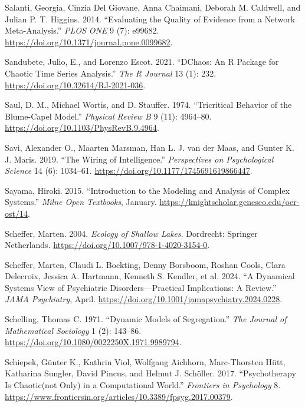\documentclass[
  a4paper,
  DIV=11,
  numbers=noendperiod,
  oneside]{scrreprt}
\newlength{\cslhangindent}
\newenvironment{CSLReferences}[2] %
 {\begin{list}{}{%
  \setlength{\itemindent}{0pt}
  \setlength{\leftmargin}{0pt}
  \setlength{\parsep}{0pt}
  \ifodd #1
   \setlength{\leftmargin}{\cslhangindent}
   \setlength{\itemindent}{-1\cslhangindent}
  \fi
  \setlength{\itemsep}{#2\baselineskip}}}
 {\end{list}}
\begin{document}
\begin{CSLReferences}{1}{0}
Salanti, Georgia, Cinzia Del Giovane, Anna Chaimani, Deborah M.
Caldwell, and Julian P. T. Higgins. 2014. {``Evaluating the Quality of
Evidence from a Network Meta-Analysis.''} \emph{PLOS ONE} 9 (7): e99682.
\url{https://doi.org/10.1371/journal.pone.0099682}.

Sandubete, Julio, E., and Lorenzo Escot. 2021. {``{DChaos}: {An R
Package} for {Chaotic Time Series Analysis}.''} \emph{The R Journal} 13
(1): 232. \url{https://doi.org/10.32614/RJ-2021-036}.

Saul, D. M., Michael Wortis, and D. Stauffer. 1974. {``Tricritical
Behavior of the {Blume-Capel} Model.''} \emph{Physical Review B} 9 (11):
4964--80. \url{https://doi.org/10.1103/PhysRevB.9.4964}.

Savi, Alexander O., Maarten Marsman, Han L. J. van der Maas, and Gunter
K. J. Maris. 2019. {``The {Wiring} of {Intelligence}.''}
\emph{Perspectives on Psychological Science} 14 (6): 1034--61.
\url{https://doi.org/10.1177/1745691619866447}.

Sayama, Hiroki. 2015. {``Introduction to the Modeling and Analysis of
Complex Systems.''} \emph{Milne Open Textbooks}, January.
\url{https://knightscholar.geneseo.edu/oer-ost/14}.

Scheffer, Marten. 2004. \emph{Ecology of {Shallow Lakes}}. {Dordrecht}:
{Springer Netherlands}. \url{https://doi.org/10.1007/978-1-4020-3154-0}.

Scheffer, Marten, Claudi L. Bockting, Denny Borsboom, Roshan Cools,
Clara Delecroix, Jessica A. Hartmann, Kenneth S. Kendler, et al. 2024.
{``A {Dynamical Systems View} of {Psychiatric Disorders}---{Practical
Implications}: {A Review}.''} \emph{JAMA Psychiatry}, April.
\url{https://doi.org/10.1001/jamapsychiatry.2024.0228}.

Schelling, Thomas C. 1971. {``Dynamic Models of Segregation.''}
\emph{The Journal of Mathematical Sociology} 1 (2): 143--86.
\url{https://doi.org/10.1080/0022250X.1971.9989794}.

Schiepek, Günter K., Kathrin Viol, Wolfgang Aichhorn, Marc-Thorsten
Hütt, Katharina Sungler, David Pincus, and Helmut J. Schöller. 2017.
{``Psychotherapy Is Chaotic{\textemdash}(not Only) in a Computational
World.''} \emph{Frontiers in Psychology} 8.
\url{https://www.frontiersin.org/articles/10.3389/fpsyg.2017.00379}.


\end{CSLReferences}
\end{document}
